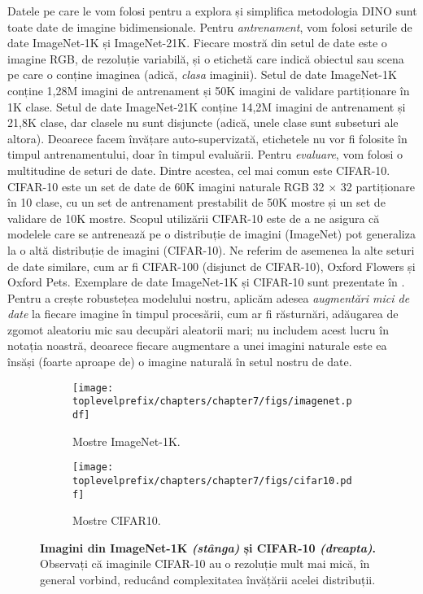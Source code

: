 \documentclass[../../book-main_ro.tex]{subfiles}
\begin{document}
Datele pe care le vom folosi pentru a explora și simplifica metodologia DINO sunt toate date de imagine bidimensionale. Pentru \textit{antrenament}, vom folosi seturile de date ImageNet-1K și ImageNet-21K. Fiecare mostră din setul de date este o imagine RGB, de rezoluție variabilă, și o etichetă care indică obiectul sau scena pe care o conține imaginea (adică, \textit{clasa} imaginii). Setul de date ImageNet-1K conține 1,28M imagini de antrenament și 50K imagini de validare partiționare în 1K clase. Setul de date ImageNet-21K conține 14,2M imagini de antrenament și 21,8K clase, dar clasele nu sunt disjuncte (adică, unele clase sunt subseturi ale altora). Deoarece facem învățare auto-supervizată, etichetele nu vor fi folosite în timpul antrenamentului, doar în timpul evaluării. Pentru \textit{evaluare}, vom folosi o multitudine de seturi de date. Dintre acestea, cel mai comun este CIFAR-10. CIFAR-10 este un set de date de 60K imagini naturale RGB 32 \(\times\) 32 partiționare în 10 clase, cu un set de antrenament prestabilit de 50K mostre și un set de validare de 10K mostre. Scopul utilizării CIFAR-10 este de a ne asigura că modelele care se antrenează pe o distribuție de imagini (ImageNet) pot generaliza la o altă distribuție de imagini (CIFAR-10). Ne referim de asemenea la alte seturi de date similare, cum ar fi CIFAR-100 (disjunct de CIFAR-10), Oxford Flowers și Oxford Pets. Exemplare de date ImageNet-1K și CIFAR-10 sunt prezentate în . Pentru a crește robustețea modelului nostru, aplicăm adesea \textit{augmentări mici de date} la fiecare imagine în timpul procesării, cum ar fi răsturnări, adăugarea de zgomot aleatoriu mic sau decupări aleatorii mari; nu includem acest lucru în notația noastră, deoarece fiecare augmentare a unei imagini naturale este ea însăși (foarte aproape de) o imagine naturală în setul nostru de date.

\begin{figure}
    \centering
    
    \hfill 
    \begin{subfigure}{0.3\textwidth}
        \centering 
        \texttt{[image: \\toplevelprefix/chapters/chapter7/figs/imagenet.pdf]}
        \caption{\small Mostre ImageNet-1K.}
    \end{subfigure}
    \hfill 
    \begin{subfigure}{0.26\textwidth}
        \centering 
        \texttt{[image: \\toplevelprefix/chapters/chapter7/figs/cifar10.pdf]}
        \caption{\small Mostre CIFAR10.}
    \end{subfigure}
    \hfill 
    \phantom{}

    \caption{\small\textbf{Imagini din ImageNet-1K \textit{(stânga)} și CIFAR-10 \textit{(dreapta)}.} Observați că imaginile CIFAR-10 au o rezoluție mult mai mică, în general vorbind, reducând complexitatea învățării acelei distribuții.}
    \label{fig:in1k_cifar10_examples}
\end{figure}
\end{document}
